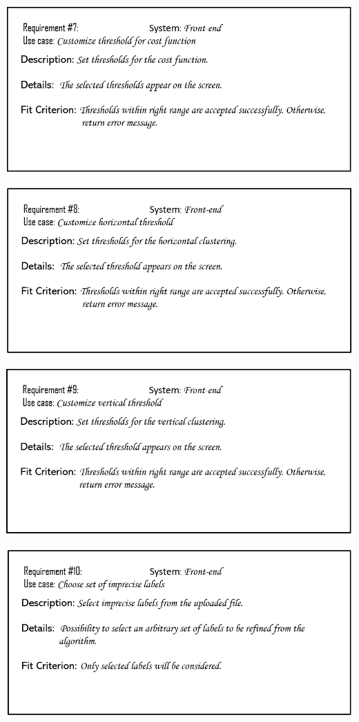 \documentclass[notitlepage]{article}
\begin{document}
\begin{flushleft}
\includegraphics[scale=0.6]{reqq7.png}

\includegraphics[scale=0.6]{reqq8.png}

\includegraphics[scale=0.6]{reqq9.png}

\includegraphics[scale=0.6]{reqq10.png}


\end{flushleft}
\end{document}
